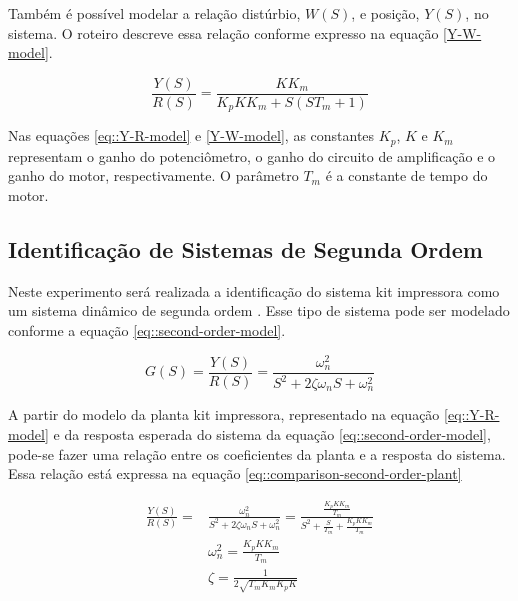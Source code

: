 Também é possível modelar a relação distúrbio, $W(S)$, e posição, $Y(S)$, no sistema. O roteiro \cite{CDIN:Roteiro1} descreve essa relação conforme expresso na equação \ref{Y-W-model}.

\begin{equation}
\frac{Y(S)}{R(S)} = \frac{ K K_m  }{ K_p K K_m + S(ST_m +1) } 
\label{Y-W-model}
\end{equation}

Nas equações \ref{eq::Y-R-model} e \ref{Y-W-model}, as constantes $K_p$, $K$ e $K_m$ representam o ganho do potenciômetro, o ganho do circuito de amplificação e o ganho do motor, respectivamente. O parâmetro $T_m$ é a constante de tempo do motor.



\subsection{Identificação de Sistemas de Segunda Ordem}
Neste experimento será realizada a identificação do sistema kit impressora como um sistema dinâmico de segunda ordem \cite{Nise:ControlSistemsEngineering}. Esse tipo de sistema pode ser modelado conforme a equação \ref{eq::second-order-model}.

\begin{equation}
G(S) = \frac{Y(S)}{R(S)} = \frac{ \omega_n ^2  }{ S^2 + 2 \zeta \omega_n S + \omega_n ^2 } 
\label{eq::second-order-model}
\end{equation}

A partir do modelo da planta kit impressora, representado na equação \ref{eq::Y-R-model} e da resposta esperada do sistema da equação \ref{eq::second-order-model}, pode-se fazer uma relação entre os coeficientes da planta e a resposta do sistema. Essa relação está expressa na equação \ref{eq::comparison-second-order-plant}

\begin{equation}
\begin{aligned}
\frac{Y(S)}{R(S)} ={} & \frac{ \omega_n ^2  }{ S^2 + 2 \zeta \omega_n S + \omega_n ^2 } = \frac{\frac{K_p K K_m}{T_m}}{S^2+ \frac{S}{T_m}+ \frac{K_p K K_m}{T_m}} \\
& \omega_n ^2 = \frac{K_p K K_m}{T_m} \\
& \zeta = \frac{1}{2\sqrt{T_m K_m K_p K}}
\end{aligned}
\label{eq::comparison-second-order-plant}
\end{equation}

